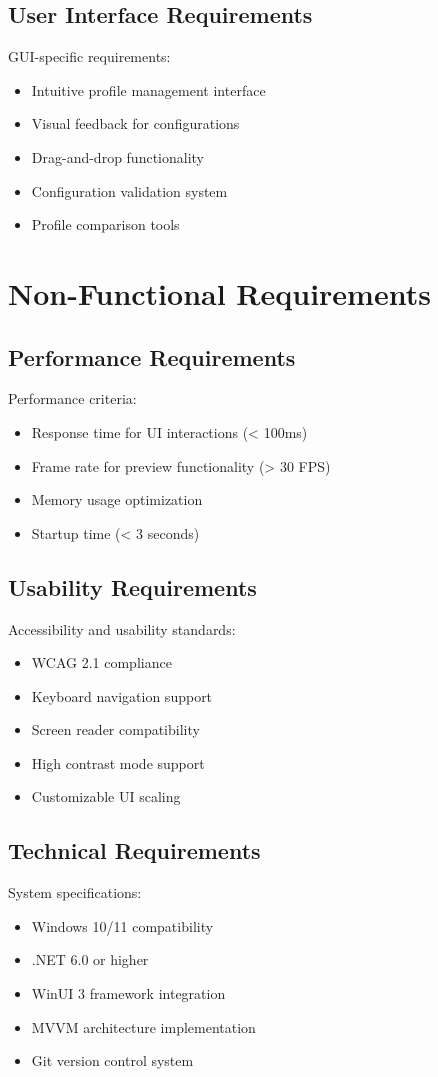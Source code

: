 \subsection{User Interface Requirements}
GUI-specific requirements:
\begin{itemize}
    \item Intuitive profile management interface
    \item Visual feedback for configurations
    \item Drag-and-drop functionality
    \item Configuration validation system
    \item Profile comparison tools
\end{itemize}

\section{Non-Functional Requirements}
\subsection{Performance Requirements}
Performance criteria:
\begin{itemize}
    \item Response time for UI interactions (< 100ms)
    \item Frame rate for preview functionality (> 30 FPS)
    \item Memory usage optimization
    \item Startup time (< 3 seconds)
\end{itemize}

\subsection{Usability Requirements}
Accessibility and usability standards:
\begin{itemize}
    \item WCAG 2.1 compliance
    \item Keyboard navigation support
    \item Screen reader compatibility
    \item High contrast mode support
    \item Customizable UI scaling
\end{itemize}

\subsection{Technical Requirements}
System specifications:
\begin{itemize}
    \item Windows 10/11 compatibility
    \item .NET 6.0 or higher
    \item WinUI 3 framework integration
    \item MVVM architecture implementation
    \item Git version control system
\end{itemize}

